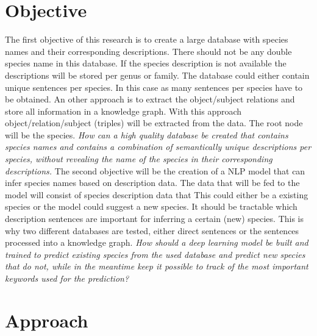 \documentclass{article}
\begin{document}
\section{Objective}
The first objective of this research is to create a large database with species names and their corresponding descriptions. 
There should not be any double species name in this database. 
If the species description is not available the descriptions will be stored per genus or family. 
The database could either contain unique sentences per species. 
In this case as many sentences per species have to be obtained.
An other approach is to extract the object/subject relations and store all information in a knowledge graph.
With this approach object/relation/subject (triples) will be extracted from the data. 
The root node will be the species.
\newline
\newline
\noindent  
\emph{How can a high quality database be created that contains species names and contains a combination of semantically unique descriptions per species, without revealing the name of the species in their corresponding descriptions.}
\noindent    
\newline
\newline
The second objective will be the creation of a NLP model that can infer species names based on description data. 
The data that will be fed to the model will consist of species description data that 
This could either be a existing species or the model could suggest a new species. 
It should be tractable which description sentences are important for inferring a certain (new) species. 
This is why two different databases are tested, either direct sentences or the sentences processed into a knowledge graph.
\newline
\newline
\noindent  
\emph{How should a deep learning model be built and trained to predict existing species from the used database and predict new species that do not, while in the meantime keep it possible to track of the most important keywords used for the prediction?}

\section{Approach}
\end{document}
